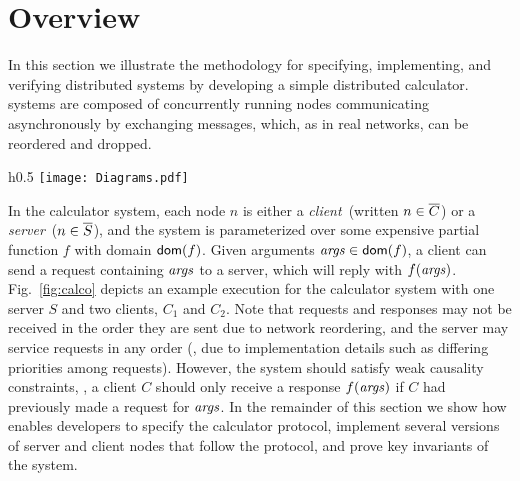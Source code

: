 

\section{Overview}
\label{sec:overview}


In this section we illustrate the \disel methodology for specifying,
implementing, and verifying distributed systems by developing a
simple distributed calculator.
%
%
\disel systems are composed of concurrently running nodes
communicating asynchronously by exchanging messages, which, as in real
networks, can be reordered and dropped.

\begin{wrapfigure}[12]{h}{0.5\textwidth}
\vspace{-10pt}
\texttt{[image: Diagrams.pdf]}
\caption{A communication scenario between a server and two client
  nodes in a distributed calculator.}
\label{fig:calco}
\end{wrapfigure}
%
%
In the calculator system, each node $n$ is either a \emph{client}~(written $n \in
\overline{C}$) or a \emph{server}~($n \in \overline{S}$), and the system is
parameterized over some expensive partial function $f$ with domain
$\mathsf{dom}(f)$.
%
%
Given arguments $\mathit{args} \in \mathsf{dom}(f)$, a client can send a request
containing $\mathit{args}$ to a server, which will reply with $f(\mathit{args})$.
%
Fig.~\ref{fig:calco} depicts an example execution for the
calculator system with one server $S$ and two clients, $C_1$ and $C_2$.
%
Note that requests and responses may not be
received in the order they are sent due to network reordering, and the
server may service requests in any order (\eg, due to implementation
details such as differing priorities among requests).
%
However, the system should satisfy weak causality constraints, \eg, a
client $C$ should only receive a response $f(\mathit{args})$ if $C$ had previously
made a request for $\mathit{args}$.
%
In the remainder of this section we show how \disel enables developers
to specify the calculator protocol, implement several versions of
server and client nodes that follow the protocol, and prove key
invariants of the system.






